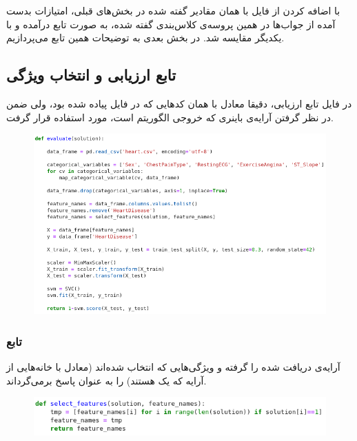 \documentclass{article}
\begin{document}
\begin{multicols}{2}
با اضافه کردن 
از فایل
با همان مقادیر گفته شده در بخش‌های قبلی، امتیازات بدست آمده از جواب‌ها در همین پروسه‌ی کلاس‌بندی گفته شده، به صورت تابع درآمده و با یکدیگر مقایسه شد. در بخش بعدی به توضیحات همین تابع می‌پردازیم.

\subsection{
تابع ارزیابی و انتخاب ویژگی
}
در فایل
تابع ارزیابی، دقیقا معادل با همان کدهایی که در فایل
پیاده شده بود، ولی ضمن در نظر گرفتن آرایه‌ی باینری
که خروجی الگوریتم
است، مورد استفاده قرار گرفت.
\begin{figure}[H]
    \centering
    \includegraphics[width=0.99\linewidth]{Photos/SA/evaluate.png}
    \caption{
    }
    \label{fig:my_label}
\end{figure}

\subsubsection{
تابع
}
آرایه‌ی
دریافت شده را گرفته و ویژگی‌هایی که انتخاب شده‌اند (معادل با خانه‌هایی از آرایه که یک هستند) را به عنوان پاسخ برمی‌گرداند.
\begin{figure}[H]
    \centering
    \includegraphics[width=0.99\linewidth]{Photos/SA/select_features.png}
    \caption{
    }
    \label{fig:my_label}
\end{figure}


\end{multicols}
\end{document}
